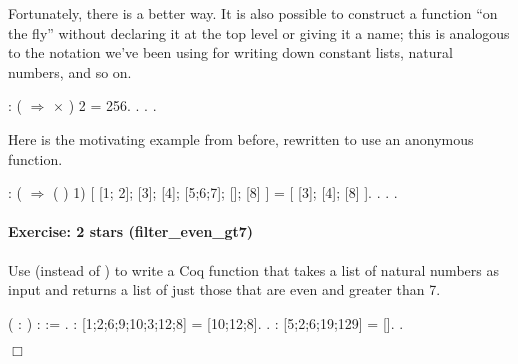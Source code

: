 \documentclass[12pt]{report}
\begin{document}
    Fortunately, there is a better way. It is also possible to
    construct a function ``on the fly'' without declaring it at the top
    level or giving it a name; this is analogous to the notation we've
    been using for writing down constant lists, natural numbers, and
    so on. \begin{coqdoccode}
\coqdocemptyline
\coqdocnoindent
{} :\coqdoceol
\coqdocindent{1.00em}
 (  \ensuremath{\Rightarrow}  \ensuremath{\times} ) 2 = 256.\coqdoceol
\coqdocnoindent
{}. . .\coqdoceol
\coqdocemptyline
\end{coqdoccode}
Here is the motivating example from before, rewritten to use
    an anonymous function. \begin{coqdoccode}
\coqdocemptyline
\coqdocnoindent
{} :\coqdoceol
\coqdocindent{2.00em}
 (  \ensuremath{\Rightarrow}  ( ) 1)\coqdoceol
\coqdocindent{5.50em}
[ [1; 2]; [3]; [4]; [5;6;7]; []; [8] ]\coqdoceol
\coqdocindent{1.00em}
= [ [3]; [4]; [8] ].\coqdoceol
\coqdocnoindent
{}. . .\coqdoceol
\coqdocemptyline
\end{coqdoccode}
\paragraph{Exercise: 2 stars (filter\_even\_gt7)}



 Use  (instead of ) to write a Coq function
     that takes a list of natural numbers as input
    and returns a list of just those that are even and greater than
    7. \begin{coqdoccode}
\coqdocemptyline
\coqdocnoindent
{}  ( :  ) :   :=\coqdoceol
\coqdocindent{1.00em}
 .\coqdoceol
\coqdocemptyline
\coqdocnoindent
{}  :\coqdoceol
\coqdocindent{1.00em}
 [1;2;6;9;10;3;12;8] = [10;12;8].\coqdoceol
 .\coqdoceol
\coqdocemptyline
\coqdocnoindent
{}  :\coqdoceol
\coqdocindent{1.00em}
 [5;2;6;19;129] = [].\coqdoceol
 .\coqdoceol
\end{coqdoccode}
\ensuremath{\Box} 
\end{document}
